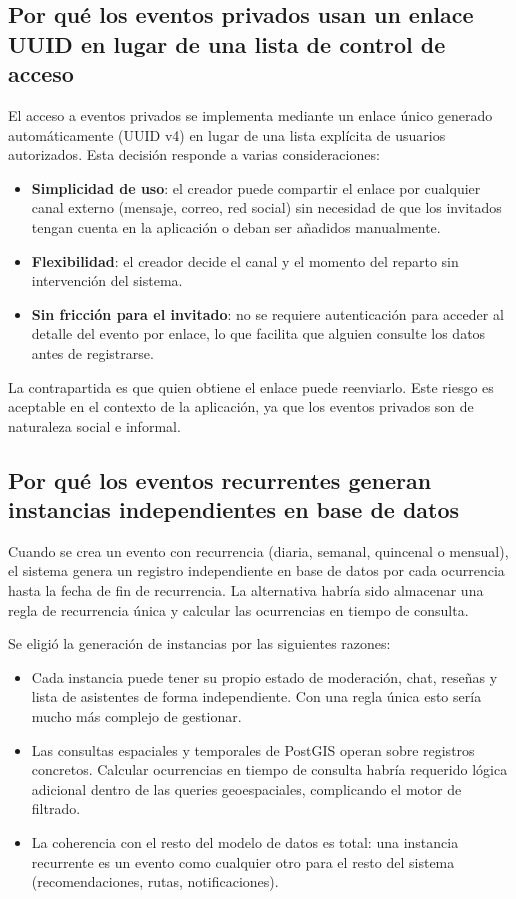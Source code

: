 \subsection{Por qué los eventos privados usan un enlace UUID en lugar de una lista de control de acceso}

El acceso a eventos privados se implementa mediante un enlace único generado automáticamente (UUID v4) en lugar de una lista explícita de usuarios autorizados. Esta decisión responde a varias consideraciones:

\begin{itemize}
    \item \textbf{Simplicidad de uso}: el creador puede compartir el enlace por cualquier canal externo (mensaje, correo, red social) sin necesidad de que los invitados tengan cuenta en la aplicación o deban ser añadidos manualmente.
    \item \textbf{Flexibilidad}: el creador decide el canal y el momento del reparto sin intervención del sistema.
    \item \textbf{Sin fricción para el invitado}: no se requiere autenticación para acceder al detalle del evento por enlace, lo que facilita que alguien consulte los datos antes de registrarse.
\end{itemize}

La contrapartida es que quien obtiene el enlace puede reenviarlo. Este riesgo es aceptable en el contexto de la aplicación, ya que los eventos privados son de naturaleza social e informal.

\subsection{Por qué los eventos recurrentes generan instancias independientes en base de datos}

Cuando se crea un evento con recurrencia (diaria, semanal, quincenal o mensual), el sistema genera un registro independiente en base de datos por cada ocurrencia hasta la fecha de fin de recurrencia. La alternativa habría sido almacenar una regla de recurrencia única y calcular las ocurrencias en tiempo de consulta.

Se eligió la generación de instancias por las siguientes razones:

\begin{itemize}
    \item Cada instancia puede tener su propio estado de moderación, chat, reseñas y lista de asistentes de forma independiente. Con una regla única esto sería mucho más complejo de gestionar.
    \item Las consultas espaciales y temporales de PostGIS operan sobre registros concretos. Calcular ocurrencias en tiempo de consulta habría requerido lógica adicional dentro de las queries geoespaciales, complicando el motor de filtrado.
    \item La coherencia con el resto del modelo de datos es total: una instancia recurrente es un evento como cualquier otro para el resto del sistema (recomendaciones, rutas, notificaciones).
\end{itemize}

